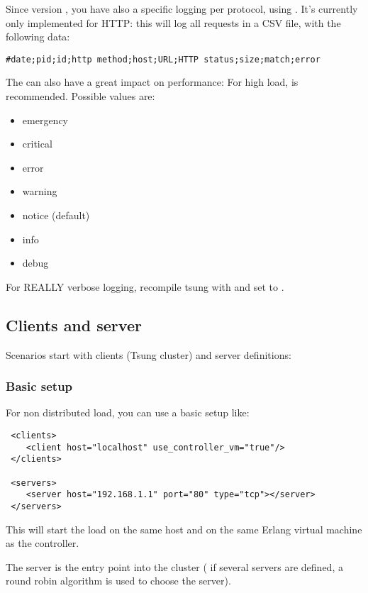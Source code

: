 \documentclass{TSUNG-en}
\begin{document}
Since version , you have also a specific logging per
 protocol, using . It's currently
 only implemented for HTTP: this will log all requests in a CSV file,
 with the following data:

\begin{Verbatim}
#date;pid;id;http method;host;URL;HTTP status;size;match;error
\end{Verbatim}


 The  can also have a great impact on performance:
 For high load,  is recommended.
 Possible values are:

\begin{itemize}
\item emergency
\item critical
\item error
\item warning
\item notice (default)
\item info
\item debug
\end{itemize}

For REALLY verbose logging, recompile tsung with 
and set  to .

\subsection{Clients and server}


 Scenarios start with clients (Tsung cluster) and server definitions:

\subsubsection{Basic setup}
For non distributed load, you can use a basic setup like:

\begin{Verbatim}
 <clients>
    <client host="localhost" use_controller_vm="true"/>
 </clients>

 <servers>
    <server host="192.168.1.1" port="80" type="tcp"></server>
 </servers>
 \end{Verbatim}

This will start the load on the same host and on the same Erlang
virtual machine as the controller.

The server is the entry point into the cluster (
if several servers are defined, a round robin algorithm is used to
choose the server).
\end{document}
